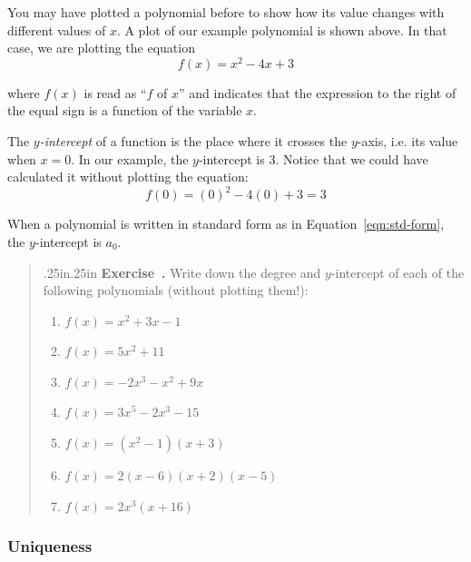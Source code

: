 \documentclass[12 pt]{article}
\newcounter{exercise}[section]
\newenvironment{exercise}{\refstepcounter{exercise}\par\bigskip \begin{quotation}{}{\leftmargin .25in\rightmargin .25in}
    \noindent \textbf{Exercise~\thesection.\theexercise }  \rmfamily}{\end{quotation}\par\bigskip}
\newcounter{example}[section]
\begin{document}
You may have plotted a polynomial before to show how its value changes 
with different values of $x$. A plot of our example polynomial is shown above.
In that case, we are plotting the equation 
\[
    f(x) = x^2 - 4x + 3
\]

where $f(x)$ is read as ``$f$ of $x$'' and indicates that the expression 
to the right of the equal sign is a function of the variable $x$. 

The \emph{$y$-intercept} of a function is the place where it crosses the $y$-axis, 
i.e. its value when $x=0$. In our example, the $y$-intercept is 3. Notice 
that we could have calculated it without plotting the equation:
\[
    f(0) = (0)^2 - 4(0) + 3 = 3
\]



When a polynomial is written in standard form as in Equation~\ref{eqn:std-form}, 
the $y$-intercept is $a_0$.



\begin{exercise}
    Write down the degree and $y$-intercept of each of the following 
    polynomials (without plotting them!):
    \renewcommand{\labelenumi}{(\alph{enumi})} 
    \begin{enumerate}
        \item $f(x) = x^2 + 3x - 1$
        \item $f(x) = 5x^2 + 11$
        \item $f(x) = -2x^3 - x^2 + 9x$
        \item $f(x) = 3x^5 - 2x^3 - 15$
        \item $f(x) = (x^2-1)(x+3)$
        \item $f(x) = 2(x-6)(x+2)(x-5)$
        \item $f(x) = 2x^3(x+16)$
    \end{enumerate}
\end{exercise}

\subsubsection{Uniqueness}\label{sec:unique}
\end{document}
